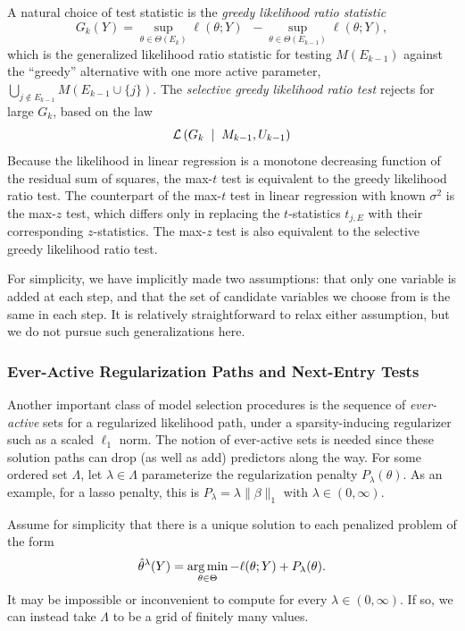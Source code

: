 \documentclass{article}
\begin{document}
A natural choice of test statistic is the {\em greedy likelihood ratio statistic}
\begin{equation}\label{eq:greedyLRT}
G_k(Y) = \sup_{\theta\in \Theta(E_k)} {\ell(\theta; Y)} \;\;- \sup_{\theta\in \Theta(E_{k-1})} {\ell(\theta; Y)},
\end{equation}
which is the generalized likelihood ratio statistic for testing $M(E_{k-1})$ against the ``greedy'' alternative with one more active parameter, $\bigcup_{j \notin E_{k-1}} M(E_{k-1} \cup \{j\})$. The {\em selective greedy likelihood ratio test} rejects for large $G_k$, based on the law
\begin{equation*}
\mathcal{L}\left(G_k \;\mid\; M_{k-1}, U_{k-1}\right)
\end{equation*}
Because the likelihood in linear regression is a monotone decreasing function of the residual sum of squares, the max-$t$ test is equivalent to the greedy likelihood ratio test. The counterpart of the max-$t$ test in linear regression with known $\sigma^2$ is the max-$z$ test, which differs only in replacing the $t$-statistics $t_{j,E}$ with their corresponding $z$-statistics. The max-$z$ test is also equivalent to the selective greedy likelihood ratio test.

For simplicity, we have implicitly made two assumptions: that only one variable is added at each step, and that the set of candidate variables we choose from is the same in each step. It is relatively straightforward to relax either assumption, but we do not pursue such generalizations here.

\subsubsection{Ever-Active Regularization Paths and Next-Entry Tests}
Another important class of model selection procedures is the sequence of {\em ever-active} sets for a regularized likelihood path, under a sparsity-inducing regularizer such as a scaled $\ell_1$ norm. The notion of ever-active sets is needed since these solution paths can drop  (as well as add) predictors along the way. For some ordered set $\Lambda$, let $\lambda\in\Lambda$ parameterize the regularization penalty $P_\lambda(\theta)$. As an example, for a lasso penalty, this is $P_\lambda = \lambda\|\beta\|_1$ with $\lambda\in (0,\infty)$. 

Assume for simplicity that there is a unique solution to each penalized problem of the form
\begin{equation}\label{eq:pen-lik}
  \hat\theta^{\lambda}(Y) =
  \operatorname*{arg\,min}_{\theta\in\Theta} -\ell(\theta; Y) + P_\lambda(\theta).
\end{equation}
It may be impossible or inconvenient to compute  for every $\lambda\in(0,\infty)$. If so, we can instead take $\Lambda$ to be a grid of finitely many values. 
\end{document}
